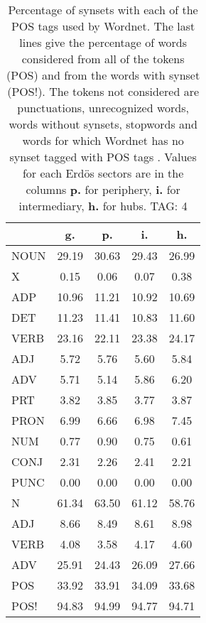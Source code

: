 \begin{table}[h!]
\begin{center}
\begin{tabular}{| l || c | c | c | c |}\hline
 & {\bf g.} & {\bf p.} & {\bf i.} & {\bf h.} \\\hline\hline
NOUN & 29.19  & 30.63  & 29.43  & 26.99 \\
X & 0.15  & 0.06  & 0.07  & 0.38 \\\hline
ADP & 10.96  & 11.21  & 10.92  & 10.69 \\
DET & 11.23  & 11.41  & 10.83  & 11.60 \\\hline
VERB & 23.16  & 22.11  & 23.38  & 24.17 \\\hline
ADJ & 5.72  & 5.76  & 5.60  & 5.84 \\
ADV & 5.71  & 5.14  & 5.86  & 6.20 \\\hline
PRT & 3.82  & 3.85  & 3.77  & 3.87 \\
PRON & 6.99  & 6.66  & 6.98  & 7.45 \\
NUM & 0.77  & 0.90  & 0.75  & 0.61 \\
CONJ & 2.31  & 2.26  & 2.41  & 2.21 \\
PUNC & 0.00  & 0.00  & 0.00  & 0.00 \\\hline\hline\hline
N & 61.34  & 63.50  & 61.12  & 58.76 \\\hline
ADJ & 8.66  & 8.49  & 8.61  & 8.98 \\\hline
VERB & 4.08  & 3.58  & 4.17  & 4.60 \\\hline
ADV & 25.91  & 24.43  & 26.09  & 27.66 \\\hline\hline
POS & 33.92  & 33.91  & 34.09  & 33.68 \\\hline
POS! & 94.83  & 94.99  & 94.77  & 94.71 \\\hline
\end{tabular}
\caption{Percentage of synsets with each of the POS tags used by Wordnet. The last lines give the percentage of words considered from all of the tokens (POS) and from the words with synset (POS!). The tokens not considered are punctuations, unrecognized words, words without synsets, stopwords and words for which Wordnet has no synset  tagged with POS tags . Values for each Erd\"os sectors are in the columns {{\bf p.}} for periphery, {{\bf i.}} for intermediary, {{\bf h.}} for hubs. TAG: 4}
\end{center}
\end{table}